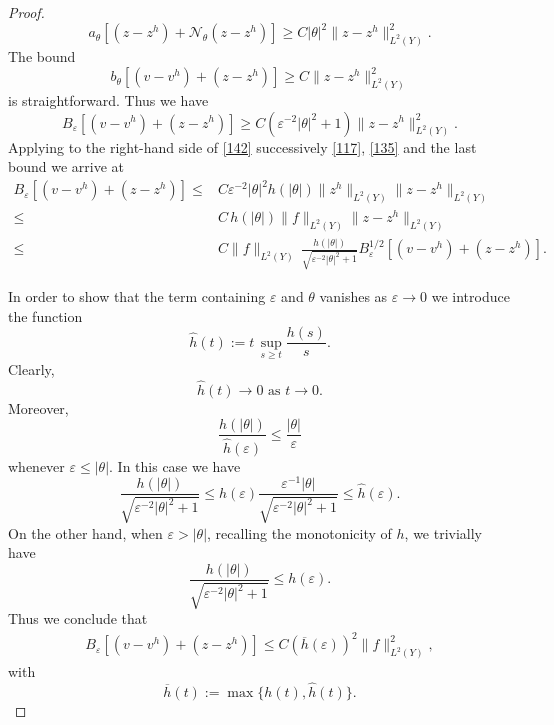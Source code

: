 \documentclass[11pt]{article}
\newcommand\e {\varepsilon}
\theoremstyle{remark}
\begin{document}
\begin{proof}
	\begin{equation*}
		a_\theta[(z -z^h) +\mathcal N_\theta(z-z^h)]\geq	C|\theta|^2  \|z-z^h\|_{L^2(Y)}^2.
	\end{equation*}
	The bound
	\begin{equation*}
		b_\theta[(v-v^h) +(z-z^h)]  \geq	C\|z-z^h\|_{L^2(Y)}^2
	\end{equation*}
	is straightforward. Thus we have
	\begin{equation*}
			B_\e[(v-v^h) +(z-z^h)] \geq C \left( \e^{-2} |\theta|^2  + 1\right)	\|z-z^h\|_{L^2(Y)}^2 .
	\end{equation*}
	Applying  to the right-hand  side of \eqref{142} successively  \eqref{117}, \eqref{135} and the last bound  we arrive at
	\begin{equation*}
		\begin{aligned}
			B_\e[(v-v^h) +(z-z^h)] \leq  &C\e^{-2}  |\theta|^2 h(|\theta|)\| z^h\|_{L^2(Y)} \|z-z^h\|_{L^2(Y)}
			\\
			 \leq& C \, h(|\theta|) \|f\|_{L^2(Y)}\|z-z^h\|_{L^2(Y)}
			\\
			\leq &C \|f\|_{L^2(Y)} \, \frac{h(|\theta|)}{\sqrt{\e^{-2} |\theta|^2  + 1}}B_\e^{1/2}[(v-v^h) +(z-z^h)].
		\end{aligned}
	\end{equation*}
	
	In order to show that the term containing $\e$ and $\theta$ vanishes as $\e \to 0$ we introduce the function
	\begin{equation}\label{219}
		\hat h(t):= t \, \sup_{s\geq t} \frac{h(s)}{s}.
	\end{equation}
	Clearly,
	\begin{equation*}
		\hat h(t) \to 0 \mbox{ as } t\to 0.
	\end{equation*}
	Moreover,
	\begin{equation*}
		\frac{h(|\theta|)}{\hat h(\e)} \leq \frac{|\theta|}\e
	\end{equation*}
	whenever $\e\leq |\theta|$.
	In this case we have
	\begin{equation*}
		\frac{h(|\theta|)}{\sqrt{\e^{-2} |\theta|^2   + 1}}  \leq   \hat h(\e) \frac{\e^{-1} |\theta|}{\sqrt{\e^{-2} |\theta|^2   + 1}} \leq \hat h(\e).
	\end{equation*}
	On the other hand, when  $\e > |\theta|$, recalling the monotonicity of $h$, we trivially have
	\begin{equation*}
		\frac{h(|\theta|)}{\sqrt{\e^{-2} |\theta|^2   + 1}} \leq   h(\e).
	\end{equation*}
Thus we conclude that
	\begin{equation*}
	\begin{aligned}
		B_\e[(v-v^h) +(z-z^h)] \leq  C  (\overline{h}(\e))^2 \|f\|^2_{L^2(Y)},
	\end{aligned}
\end{equation*}
	with
	\begin{equation}\label{225}
		\overline{h}(t) := \max \{h(t) , \hat h(t)\}.
	\end{equation}
	

\end{proof}
\end{document}
